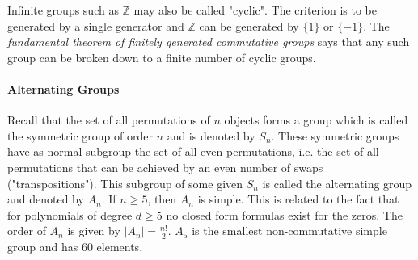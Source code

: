 %

\medskip
Infinite groups such as $\mathbb{Z}$ may also be called "cyclic". The criterion is to be generated by a single generator and $\mathbb{Z}$ can be generated by $\{1\}$ or $\{-1\}$. The \emph{fundamental theorem of finitely generated commutative groups} says that any such group can be broken down to a finite number of cyclic groups.










\paragraph{Alternating Groups}
Recall that the set of all permutations of $n$ objects forms a group which is called the symmetric group of order $n$ and is denoted by $S_n$. These symmetric groups have as normal subgroup the set of all even permutations, i.e. the set of all permutations that can be achieved by an even number of swaps ("transpositions"). This subgroup of some given $S_n$ is called the alternating group and denoted by $A_n$. If $n \geq 5$, then $A_n$ is simple. This is related to the fact that for polynomials of degree $d \geq 5$ no closed form formulas exist for the zeros. The order of $A_n$ is given by $|A_n| = \frac{n !}{2}$. $A_5$ is the smallest non-commutative simple group and has 60 elements.


